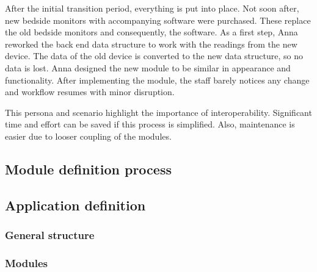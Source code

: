         After the initial transition period, everything is put into place. Not soon after, new bedside monitors with accompanying software were purchased. These replace the old bedside monitors and consequently, the software. As a first step, Anna reworked the back end data structure to work with the readings from the new device. The data of the old device is converted to the new data structure, so no data is lost. Anna designed the new module to be similar in appearance and functionality. After implementing the module, the staff barely notices any change and workflow resumes with minor disruption.\bigskip

        \noindent This persona and scenario highlight the importance of interoperability. Significant time and effort can be saved if this process is simplified. Also, maintenance is easier due to looser coupling of the modules.

    \subsection{Module definition process}\label{module_brainstorm}

    \subsection{Application definition}\label{app_definition}

        \subsubsection{General structure}



        \subsubsection{Modules}
